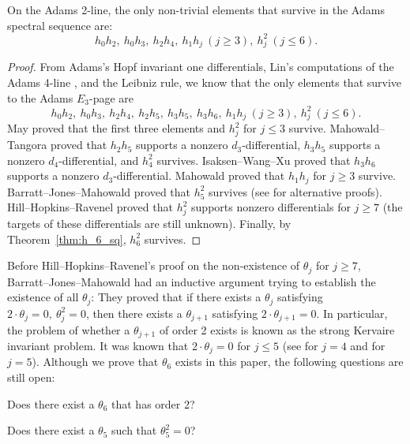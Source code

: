 \documentclass{amsart}
\numberwithin{equation}{section}
\begin{document}
\begin{corollary} \label{cor:2line}
    On the Adams 2-line, the only non-trivial elements that survive in the Adams spectral sequence are:
    $$h_0h_2, \ h_0h_3, \ h_2h_4, \ h_1h_j \ (j \geq 3), \ h_j^2 \ (j \leq 6).$$
\end{corollary}

\begin{proof}
    From Adams's Hopf invariant one differentials, Lin's computations of the Adams 4-line \cite{LinExt4}, and the Leibniz rule, we know that the only elements that survive to the Adams $E_3$-page are
    $$h_0h_2, \ h_0h_3, \ h_2h_4, \ h_2h_5, \ h_3h_5, \ h_3h_6, \ h_1h_j \ (j \geq 3), \ h_j^2 \ (j \leq 6).$$
May \cite{Maythesis} proved that the first three elements and $h_j^2$ for $j \leq 3$ survive. Mahowald--Tangora \cite{MahowaldTangora} proved that $h_2h_5$ supports a nonzero $d_3$-differential, $h_3h_5$ supports a nonzero $d_4$-differential, and $h_4^2$ survives. Isaksen--Wang--Xu \cite{IWX} proved that $h_3h_6$ supports a nonzero $d_3$-differential. Mahowald \cite{Mahowaldetaj} proved that $h_1h_j$ for $j \geq 3$ survive. Barratt--Jones--Mahowald \cite{BJMtheta5} proved that $h_5^2$ survives (see \cite{Xu, IWX} for alternative proofs). Hill--Hopkins--Ravenel \cite{HHR} proved that $h_j^2$ supports nonzero differentials for $j \geq 7$ (the targets of these differentials are still unknown). Finally, by Theorem~\ref{thm:h_6_sq}, $h_6^2$ survives.   
\end{proof}

Before Hill--Hopkins--Ravenel's proof on the non-existence of $\theta_j$ for $j \geq 7$, Barratt--Jones--Mahowald \cite{BJMinduction} had an inductive argument trying to establish the existence of all $\theta_j$: They proved that if there exists a $\theta_j$ satisfying $2\cdot \theta_j = 0, \ \theta_j^2 = 0$, then there exists a $\theta_{j+1}$ satisfying $2\cdot \theta_{j+1} = 0$. In particular, the problem of whether a $\theta_{j+1}$ of order 2 exists is known as the strong Kervaire invariant problem. It was known that $2\cdot \theta_j = 0$ for $j \leq 5$ (see \cite{MahowaldTangora} for $j=4$ and \cite{Xu, IWX} for $j=5$). Although we prove that $\theta_6$ exists in this paper, the following questions are still open:

\begin{question} \label{que:2theta6}
    Does there exist a $\theta_6$ that has order 2?
\end{question}

\begin{question} \label{que:theta5sq}
    Does there exist a $\theta_5$ such that $\theta_5^2 = 0$?
\end{question}
\end{document}
